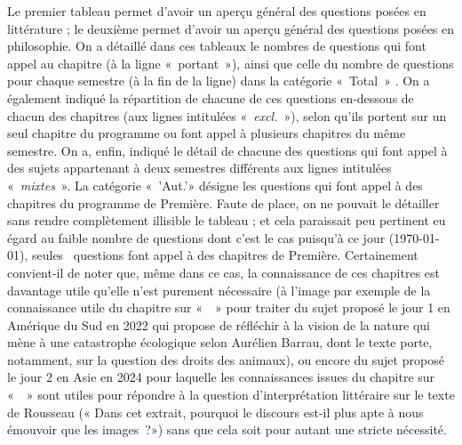 Le premier tableau permet d'avoir un aperçu général des questions posées en littérature ; le deuxième permet d'avoir un aperçu général des questions posées en philosophie. On a détaillé dans ces tableaux le nombres de questions qui font appel au chapitre (à la ligne «~portant~»{}), ainsi que celle du nombre de questions pour chaque semestre (à la fin de la ligne) dans la catégorie «~Total~»{} . On a également indiqué la répartition de chacune de ces questions en-dessous de chacun des chapitres (aux lignes intitulées «~\textit{excl.}~»{}), selon qu'ils portent sur un seul chapitre du programme ou font appel à plusieurs chapitres du même semestre. On a, enfin, indiqué le détail de chacune des questions qui font appel à des sujets appartenant à deux semestres différents aux lignes intitulées «~\textit{mixtes}~»{}. La catégorie «~'Aut.'»{} désigne les questions qui font appel à des chapitres du programme de Première. Faute de place, on ne pouvait le détailler sans rendre complètement illisible le tableau ; et cela paraissait peu pertinent eu égard au faible nombre de questions dont c'est le cas puisqu'à ce jour (\today{}), seules ~questions font appel à des chapitres de Première. Certainement convient-il de noter que, même dans ce cas, la connaissance de ces chapitres est davantage utile qu'elle n'est purement nécessaire (à l'image par exemple de la connaissance utile du chapitre sur «~\HA~»{} pour traiter du sujet proposé le jour 1 en Amérique du Sud en 2022 qui propose de réfléchir à la vision de la nature qui mène à une catastrophe écologique selon Aurélien Barrau, dont le texte porte, notamment, sur la question des droits des animaux), ou encore du sujet proposé le jour 2 en Asie en 2024 pour laquelle les connaissances issues du chapitre sur «~\PdP~»{} sont utiles pour répondre à la question d'interprétation littéraire sur le texte de Rousseau (« Dans cet extrait, pourquoi le discours est-il plus apte à nous émouvoir que les images~?»{}) sans que cela soit pour autant une stricte nécessité.

